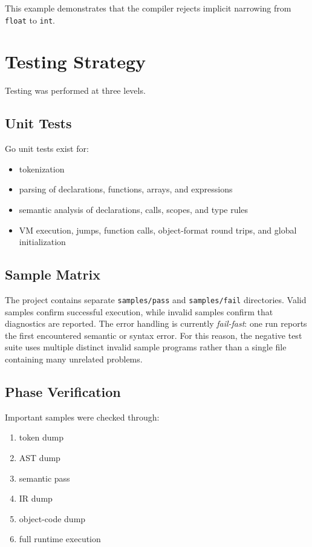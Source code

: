 \documentclass[11pt,a4paper]{article}
\begin{document}
This example demonstrates that the compiler rejects implicit narrowing from
\texttt{float} to \texttt{int}.

\section{Testing Strategy}

Testing was performed at three levels.

\subsection*{Unit Tests}

Go unit tests exist for:

\begin{itemize}[leftmargin=2em]
    \item tokenization
    \item parsing of declarations, functions, arrays, and expressions
    \item semantic analysis of declarations, calls, scopes, and type rules
    \item VM execution, jumps, function calls, object-format round trips, and
    global initialization
\end{itemize}

\subsection*{Sample Matrix}

The project contains separate \texttt{samples/pass} and \texttt{samples/fail}
directories. Valid samples confirm successful execution, while invalid samples
confirm that diagnostics are reported. The error handling is currently
\emph{fail-fast}: one run reports the first encountered semantic or syntax error.
For this reason, the negative test suite uses multiple distinct invalid sample
programs rather than a single file containing many unrelated problems.

\subsection*{Phase Verification}

Important samples were checked through:

\begin{enumerate}[leftmargin=2em]
    \item token dump
    \item AST dump
    \item semantic pass
    \item IR dump
    \item object-code dump
    \item full runtime execution
\end{enumerate}
\end{document}
